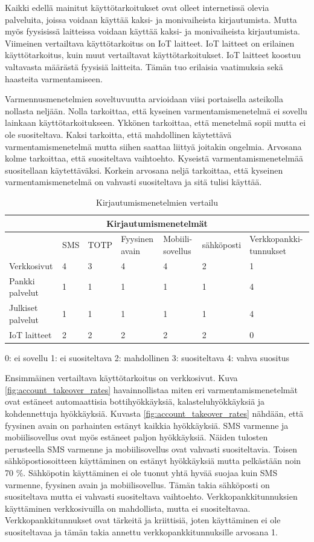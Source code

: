 Kaikki edellä mainitut käyttötarkoitukset ovat olleet internetissä olevia palveluita, joissa voidaan käyttää kaksi- ja monivaiheista kirjautumista. Mutta myös fyysisissä laitteissa voidaan käyttää kaksi- ja monivaiheista kirjautumista. Viimeinen vertailtava käyttötarkoitus on IoT laitteet. IoT laitteet on erilainen käyttötarkoitus, kuin muut vertailtavat käyttötarkoitukset. IoT laitteet koostuu valtavasta määrästä fyysisiä laitteita. Tämän tuo erilaisia vaatimuksia sekä haasteita varmentamiseen.

Varmennusmenetelmien soveltuvuutta arvioidaan viisi portaisella asteikolla nollasta neljään. Nolla tarkoittaa, että kyseinen varmentamismenetelmä ei sovellu lainkaan käyttötarkoitukseen. Ykkönen tarkoittaa, että menetelmä sopii mutta ei ole suositeltava. Kaksi tarkoitta, että mahdollinen käytettävä varmentamismenetelmä mutta siihen saattaa liittyä joitakin ongelmia. Arvosana kolme tarkoittaa, että suositeltava vaihtoehto. Kyseistä varmentamismenetelmää suositellaan käytettäväksi. Korkein arvosana neljä tarkoittaa, että kyseinen varmentamismenetelmä on vahvasti suositeltava ja sitä tulisi käyttää.



\begin{table}[ht]
\begin{tabular}{ |p{3cm}|p{1cm}|p{}|p{}|p{}|p{2cm}|p{}|  }
 \hline
 \multicolumn{7}{|c|}{ Kirjautumismenetelmät} \\
 \hline
 & SMS & TOTP &Fyysinen avain & Mobiili-sovellus & sähköposti & Verkkopankki-tunnukset\\
 \hline
 Verkkosivut& 4 & 3 & 4 & 4 & 2 & 1\\
 Pankki palvelut& 1 & 1 & 1 & 1 & 1 & 4\\
 Julkiset palvelut& 1 & 1 & 1 & 1 & 1 & 4\\
 IoT laitteet& 2 & 2 & 2 & 2 & 2 & 0\\
 \hline
\end{tabular}
\caption{\label{tab:vertailu} Kirjautumismenetelmien vertailu}
\end{table}

0: ei sovellu
1: ei suositeltava
2: mahdollinen
3: suositeltava
4: vahva suositus


Ensimmäinen vertailtava käyttötarkoitus on verkkosivut. Kuva \ref{fig:account_takeover_rates} havainnollistaa miten eri varmentamismenetelmät ovat estäneet automaattisia bottihyökkäyksiä, kalasteluhyökkäyksiä ja kohdennettuja hyökkäyksiä. Kuvasta \ref{fig:account_takeover_rates} nähdään, että fyysinen avain on parhainten estänyt kaikkia hyökkäyksiä. SMS varmenne ja mobiilisovellus ovat myös estäneet paljon hyökkäyksiä. Näiden tulosten perusteella SMS varmenne ja mobiilisovellus ovat vahvasti suositeltavia. Toisen sähköpostiosoitteen käyttäminen on estänyt hyökkäyksiä mutta pelkästään noin 70 \%. Sähköpotin käyttäminen ei ole tuonut yhtä hyvää suojaa kuin SMS varmenne, fyysinen avain ja mobiilisovellus. Tämän takia sähköposti on suositeltava mutta ei vahvasti suositeltava vaihtoehto. Verkkopankkitunnuksien käyttäminen verkkosivuilla on mahdollista, mutta ei suositeltavaa. Verkkopankkitunnukset ovat tärkeitä ja kriittisiä, joten käyttäminen ei ole suositeltavaa ja tämän takia annettu verkkopankkitunnuksille arvosana 1.

